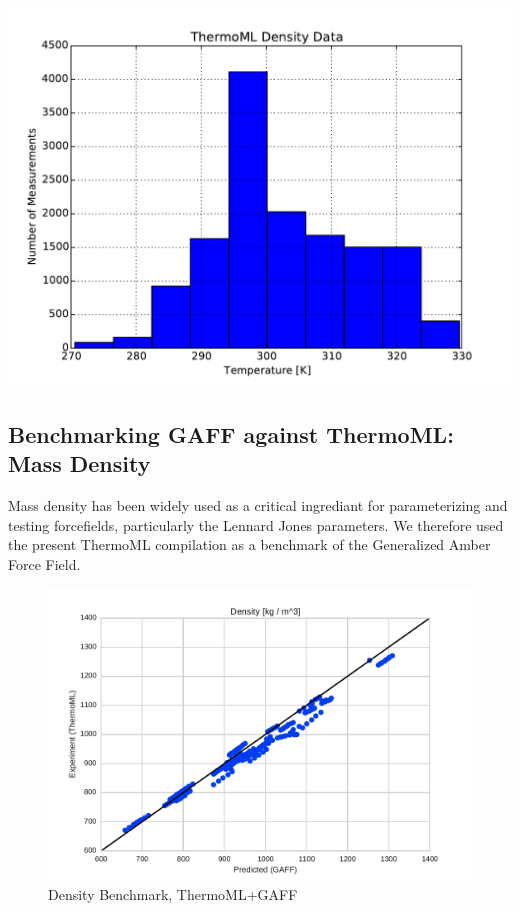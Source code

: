 \documentclass[aps,pre,twocolumn,superscriptaddress]{revtex4-1}
\begin{document}
\includegraphics[width=\columnwidth]{./figures/thermoml_density_histogram.pdf}

\subsection{Benchmarking GAFF against ThermoML: Mass Density}

Mass density has been widely used as a critical ingrediant for parameterizing and testing forcefields, particularly the Lennard Jones parameters.  We therefore used the present ThermoML compilation as a benchmark of the Generalized Amber Force Field.  

\begin{figure}
\includegraphics[width=\columnwidth]{./figures/densities_thermoml.pdf}
\caption{Density Benchmark, ThermoML+GAFF} 
\end{figure}
\end{document}
